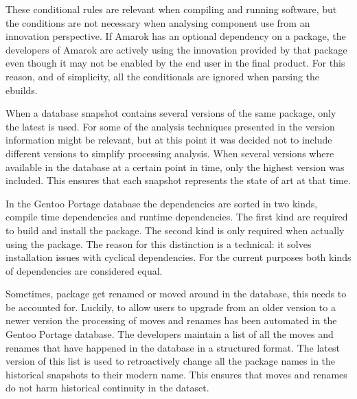 \documentclass[smallextended,final]{svjour3}
\begin{document}
These conditional rules are relevant when compiling and running software, but the conditions are not necessary when analysing component use from an innovation perspective. If Amarok has an optional dependency on a package, the developers of Amarok are actively using the innovation provided by that package even though it may not be enabled by the end user in the final product. For this reason, and of simplicity, all the conditionals are ignored when parsing the ebuilds.

When a database snapshot contains several versions of the same package, only the latest is used. For some of the analysis techniques presented in the version information might be relevant, but at this point it was decided not to include different versions to simplify processing analysis. When several versions where available in the database at a certain point in time, only the highest version was included. This ensures that each snapshot represents the state of art at that time.

In the Gentoo Portage database the dependencies are sorted in two kinds, compile time dependencies and runtime dependencies. The first kind are required to build and install the package. The second kind is only required when actually using the package. The reason for this distinction is a technical: it solves installation issues with cyclical dependencies. For the current purposes both kinds of dependencies are considered equal.

Sometimes, package get renamed or moved around in the database, this needs to be accounted for. Luckily, to allow users to upgrade from an older version to a newer version the processing of moves and renames has been automated in the Gentoo Portage database. The developers maintain a list of all the moves and renames that have happened in the database in a structured format. The latest version of this list is used to retroactively change all the package names in the historical snapshots to their modern name. This ensures that moves and renames do not harm historical continuity in the dataset.
\end{document}

